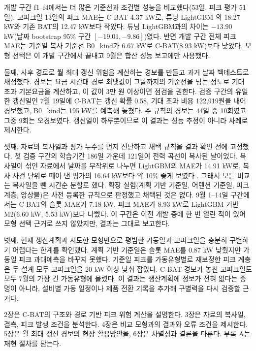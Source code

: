 개발 구간 f1--f4에서는 더 많은 기준선과 조건별 성능을 비교했다(53일, 피크 평가 51일). 고피크일 13일의 피크 MAE는 C-BAT 4.37 kW로, 튜닝 LightGBM \citep{ke2017lightgbm}의 18.27 kW와 기존 BAT의 12.47 kW보다 작았다. 튜닝 LightGBM과의 차이는 $-13.90$ kW(날짜 bootstrap 95\% 구간 $[-19.01,-9.86]$)였다. 반면 개발 구간 전체 피크 MAE는 기준일 복사 기준선 B0\_kind가 6.67 kW로 C-BAT(8.93 kW)보다 낮았다. 모형 선택은 이 개발 구간에서 끝내고 9월은 합산 성능 보고에만 사용했다.

둘째, 사후 경로로 월 최대 갱신 위험을 계산하는 경보를 만들고 과거 날짜 백테스트로 채점했다. 경보는 요금 시간대 경로 최댓값이 그날까지의 기준선을 넘는 정도로 기대 초과 기본요금을 계산하고, 이 값이 3만 원 이상이면 점검을 권한다. 검증 구간의 유일한 갱신일인 7월 19일에 C-BAT는 갱신 확률 0.58, 기대 초과 비용 122,919원을 내어 경보했고, B0\_kind는 195 kW를 예측해 놓쳤다. 주 규칙의 경보는 44일 중 10회였고 그중 9회는 오경보였다. 갱신일이 하루뿐이므로 이 결과는 성능 추정이 아니라 사례로 제시한다.

셋째, 자료의 복사일과 평가 누수를 먼저 진단하고 채택 규칙을 결과 확인 전에 고정했다. 첫 검증 구간의 학습기간 186일 가운데 121일이 전력 곡선이 복사된 날이었다. 복사일이 섞인 자료에서 날짜를 무작위로 나누면 LightGBM의 MAE가 14.91 kW로, 복사 사건 단위로 떼어 낸 평가의 16.64 kW보다 약 10\% 좋게 보였다 \citep{roberts2017blockcv,kapoor2023leakage}. 그래서 모든 비교는 복사일을 뺀 시간순 분할로 했다. 확장 실험(계획 기반 기준일, 어텐션 기준일, 피크 계층, 앙상블)은 사전 등록한 규칙으로 판정했고 채택된 것은 없다. 9월 1--14일 구간에서는 C-BAT의 슬롯 MAE가 7.18 kW, 피크 MAE가 8.93 kW로 LightGBM 기반 M2(6.60 kW, 5.53 kW)보다 나빴다. 이 구간은 이전 개발 중에 한 번 열린 적이 있어 모형 선택 근거로 쓰지 않았지만, 결과는 그대로 보고한다.

넷째, 현재 생산계획과 시도한 모형만으로 평범한 가동일과 고피크일을 충분히 구별하기 어렵다는 한계를 확인했다. 계획 기반 기준일은 슬롯 MAE를 0.87 kW 낮췄지만 가동일 피크 과대예측을 바꾸지 못했다. 기준일 피크를 가동유형별로 재보정한 피크 계층은 두 설계 모두 고피크일을 20 kW 이상 낮춰 잡았다. C-BAT 경보가 놓친 고피크일도 모두 7월의 가장 긴 가동유형에 몰렸다. 이 결과는 생산계획에 정보가 전혀 없다는 증명이 아니라, 설비별 가동 일정이나 제품 전환 기록을 추가해 구별력을 다시 검증할 근거다.

2장은 C-BAT의 구조와 경로 기반 피크 위험 계산을 설명한다. 3장은 자료의 복사일, 결측, 피크 발생 조건을 분석한다. 4장은 비교 모형과의 결과와 오류 조건을 제시한다. 5장은 월 최대 갱신 경보의 현장 활용방안을, 6장은 차별성과 결론을 다룬다. 부록 A는 재현 절차를 담는다.
